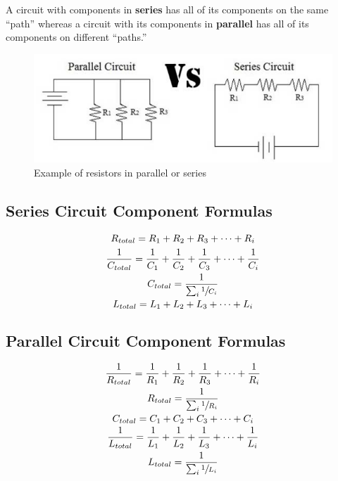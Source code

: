 \documentclass{article}
\begin{document}
A circuit with components in \textbf{series} has all of its components on the same “path” whereas a circuit with its components in \textbf{parallel} has all of its components on different “paths.” 

\begin{figure} [h]
    \centering
    \includegraphics[width=\textwidth]{img/ParallelSeries.png}
    \caption{Example of resistors in parallel or series}
    \label{fig:ParallelSeries}
\end{figure}

\subsection{Series Circuit Component Formulas}

\begin{gather*}
R_{total} = R_{1} + R_{2} + R_{3} + \dots + R_{i} \\
\frac{1}{C_{total}} = \frac{1}{C_{1}} +  \frac{1}{C_{2}} + \frac{1}{C_{3}} + \dots + \frac{1}{C_{i}} \\
C_{total} = \frac{1}{\sum_{i} \sfrac{1}{C_{i}}} \\
L_{total} = L_{1} + L_{2} + L_{3} + \dots + L_{i}
\end{gather*}

\subsection{Parallel Circuit Component Formulas}

\begin{gather*}
\frac{1}{R_{total}} = \frac{1}{R_{1}} +  \frac{1}{R_{2}} + \frac{1}{R_{3}} + \dots + \frac{1}{R_{i}} \\
R_{total} = \frac{1}{\sum_{i} \sfrac{1}{R_{i}}} \\
C_{total} = C_{1} + C_{2} + C_{3} + \dots + C_{i} \\
\frac{1}{L_{total}} = \frac{1}{L_{1}} +  \frac{1}{L_{2}} + \frac{1}{L_{3}} + \dots + \frac{1}{L_{i}} \\
L_{total} = \frac{1}{\sum_{i} \sfrac{1}{L_{i}}} \\
\end{gather*}
\end{document}
